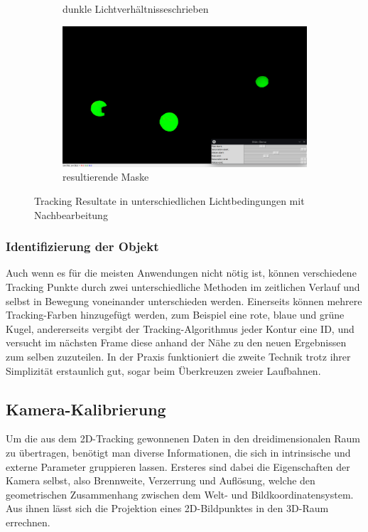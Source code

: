 \documentclass[12pt, ngerman]{article}
\begin{document}
\begin{figure}[htbp!]
\begin{subfigure}[t]{0.45\textwidth}
      \caption{dunkle Lichtverhältnisseschrieben}
      \label{Abb: 2d-color-dunkel}
  \end{subfigure}
  \hfill
  \vspace{10pt}
  \begin{subfigure}[t]{0.6\textwidth}
      \centering
      \includegraphics[width=\textwidth]{2d-color-filter.jpg}
      \caption{resultierende Maske}
      \label{Abb: 2d-color-maske}
  \end{subfigure}
  \caption{Tracking Resultate in unterschiedlichen Lichtbedingungen mit Nachbearbeitung}
  \label{Abb: Nachbearbeitungen}
\end{figure}

\subsubsection{Identifizierung der Objekt}
Auch wenn es für die meisten Anwendungen nicht nötig ist, können verschiedene Tracking Punkte durch zwei unterschiedliche Methoden im zeitlichen Verlauf und selbst in Bewegung voneinander unterschieden werden. Einerseits können mehrere Tracking-Farben hinzugefügt werden, zum Beispiel eine rote, blaue und grüne Kugel, andererseits vergibt der Tracking-Algorithmus jeder Kontur eine ID, und versucht im nächsten Frame diese anhand der Nähe zu den neuen Ergebnissen zum selben zuzuteilen. In der Praxis funktioniert die zweite Technik trotz ihrer Simplizität erstaunlich gut, sogar beim Überkreuzen zweier Laufbahnen.  

\subsection{Kamera-Kalibrierung}
Um die aus dem 2D-Tracking gewonnenen Daten in den dreidimensionalen Raum zu übertragen, benötigt man diverse Informationen, die sich in intrinsische und externe Parameter gruppieren lassen. Ersteres sind dabei die Eigenschaften der Kamera selbst, also Brennweite, Verzerrung und Auflösung, welche den geometrischen Zusammenhang zwischen dem Welt- und Bildkoordinatensystem. Aus ihnen lässt sich die Projektion eines 2D-Bildpunktes in den 3D-Raum errechnen. 
\end{document}
